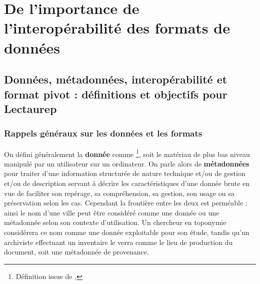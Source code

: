 \section{De l'importance de l'interopérabilité des formats de données}

\subsection{Données, métadonnées, interopérabilité et format pivot : définitions et objectifs pour Lectaurep}

\subsubsection{Rappels généraux sur les données et les formats}

On défini généralement la \textbf{donnée} comme \footnote{Définition issue de \cite{noauthor_abrege_2020}.}, soit le matériau de plus bas niveau manipulé par un utilisateur sur un ordinateur. On parle alors de \textbf{métadonnées} pour traiter d'une information structurée de nature technique et/ou de gestion et/ou de description servant à décrire les caractéristiques d'une donnée brute en vue de faciliter son repérage, sa compréhension, sa gestion, son usage ou sa préservation selon les cas. Cependant la frontière entre les deux est perméable : ainsi le nom d'une ville peut être considéré comme une donnée ou une métadonnée selon son contexte d'utilisation. Un chercheur en toponymie considérera ce nom comme une donnée exploitable pour son étude, tandis qu'un archiviste effectuant un inventaire le verra comme le lieu de production du document, soit une métadonnée de provenance. 

